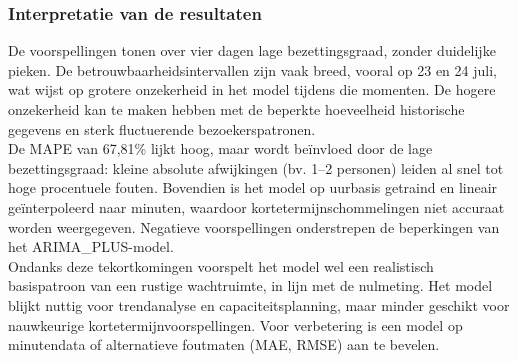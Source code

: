 

\subsubsection{Interpretatie van de resultaten} \TODO
De voorspellingen tonen over vier dagen lage bezettingsgraad, zonder duidelijke pieken. De betrouwbaarheidsintervallen zijn vaak breed, vooral op 23 en 24 juli, wat wijst op grotere onzekerheid in het model tijdens die momenten. De hogere onzekerheid kan te maken hebben met de beperkte hoeveelheid historische gegevens en sterk fluctuerende bezoekerspatronen. \\

De MAPE van 67,81\% lijkt hoog, maar wordt beïnvloed door de lage bezettingsgraad: kleine absolute afwijkingen (bv. 1–2 personen) leiden al snel tot hoge procentuele fouten. Bovendien is het model op uurbasis getraind en lineair geïnterpoleerd naar minuten, waardoor kortetermijnschommelingen niet accuraat worden weergegeven. Negatieve voorspellingen onderstrepen de beperkingen van het ARIMA\_PLUS-model. \\

Ondanks deze tekortkomingen voorspelt het model wel een realistisch basispatroon van een rustige wachtruimte, in lijn met de nulmeting. Het model blijkt nuttig voor trendanalyse en capaciteitsplanning, maar minder geschikt voor nauwkeurige kortetermijnvoorspellingen. Voor verbetering is een model op minutendata of alternatieve foutmaten (MAE, RMSE) aan te bevelen.









